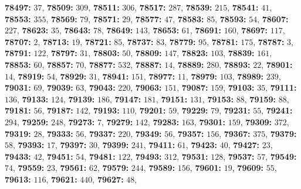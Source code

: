 \textsf{\bfseries 78497:} $37$, \textsf{\bfseries 78509:} $309$, \textsf{\bfseries 78511:} $306$, \textsf{\bfseries 78517:} $287$, \textsf{\bfseries 78539:} $215$, \textsf{\bfseries 78541:} $41$, \textsf{\bfseries 78553:} $355$, \textsf{\bfseries 78569:} $79$, \textsf{\bfseries 78571:} $29$, \textsf{\bfseries 78577:} $47$, \textsf{\bfseries 78583:} $85$, \textsf{\bfseries 78593:} $54$, \textsf{\bfseries 78607:} $227$, \textsf{\bfseries 78623:} $35$, \textsf{\bfseries 78643:} $78$, \textsf{\bfseries 78649:} $143$, \textsf{\bfseries 78653:} $61$, \textsf{\bfseries 78691:} $160$, \textsf{\bfseries 78697:} $117$, \textsf{\bfseries 78707:} $2$, \textsf{\bfseries 78713:} $19$, \textsf{\bfseries 78721:} $85$, \textsf{\bfseries 78737:} $83$, \textsf{\bfseries 78779:} $95$, \textsf{\bfseries 78781:} $175$, \textsf{\bfseries 78787:} $3$, \textsf{\bfseries 78791:} $122$, \textsf{\bfseries 78797:} $31$, \textsf{\bfseries 78803:} $50$, \textsf{\bfseries 78809:} $147$, \textsf{\bfseries 78823:} $103$, \textsf{\bfseries 78839:} $161$, \textsf{\bfseries 78853:} $60$, \textsf{\bfseries 78857:} $70$, \textsf{\bfseries 78877:} $532$, \textsf{\bfseries 78887:} $14$, \textsf{\bfseries 78889:} $280$, \textsf{\bfseries 78893:} $22$, \textsf{\bfseries 78901:} $14$, \textsf{\bfseries 78919:} $54$, \textsf{\bfseries 78929:} $31$, \textsf{\bfseries 78941:} $151$, \textsf{\bfseries 78977:} $11$, \textsf{\bfseries 78979:} $103$, \textsf{\bfseries 78989:} $239$, \textsf{\bfseries 79031:} $69$, \textsf{\bfseries 79039:} $63$, \textsf{\bfseries 79043:} $220$, \textsf{\bfseries 79063:} $151$, \textsf{\bfseries 79087:} $159$, \textsf{\bfseries 79103:} $35$, \textsf{\bfseries 79111:} $136$, \textsf{\bfseries 79133:} $124$, \textsf{\bfseries 79139:} $186$, \textsf{\bfseries 79147:} $181$, \textsf{\bfseries 79151:} $131$, \textsf{\bfseries 79153:} $88$, \textsf{\bfseries 79159:} $88$, \textsf{\bfseries 79181:} $56$, \textsf{\bfseries 79187:} $142$, \textsf{\bfseries 79193:} $110$, \textsf{\bfseries 79201:} $59$, \textsf{\bfseries 79229:} $79$, \textsf{\bfseries 79231:} $55$, \textsf{\bfseries 79241:} $294$, \textsf{\bfseries 79259:} $248$, \textsf{\bfseries 79273:} $7$, \textsf{\bfseries 79279:} $142$, \textsf{\bfseries 79283:} $163$, \textsf{\bfseries 79301:} $159$, \textsf{\bfseries 79309:} $372$, \textsf{\bfseries 79319:} $28$, \textsf{\bfseries 79333:} $56$, \textsf{\bfseries 79337:} $220$, \textsf{\bfseries 79349:} $56$, \textsf{\bfseries 79357:} $156$, \textsf{\bfseries 79367:} $375$, \textsf{\bfseries 79379:} $58$, \textsf{\bfseries 79393:} $17$, \textsf{\bfseries 79397:} $30$, \textsf{\bfseries 79399:} $241$, \textsf{\bfseries 79411:} $61$, \textsf{\bfseries 79423:} $40$, \textsf{\bfseries 79427:} $23$, \textsf{\bfseries 79433:} $42$, \textsf{\bfseries 79451:} $54$, \textsf{\bfseries 79481:} $122$, \textsf{\bfseries 79493:} $312$, \textsf{\bfseries 79531:} $128$, \textsf{\bfseries 79537:} $57$, \textsf{\bfseries 79549:} $74$, \textsf{\bfseries 79559:} $23$, \textsf{\bfseries 79561:} $62$, \textsf{\bfseries 79579:} $244$, \textsf{\bfseries 79589:} $156$, \textsf{\bfseries 79601:} $19$, \textsf{\bfseries 79609:} $55$, \textsf{\bfseries 79613:} $116$, \textsf{\bfseries 79621:} $440$, \textsf{\bfseries 79627:} $48$, 
